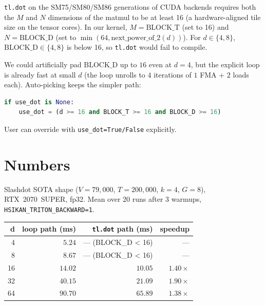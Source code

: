\documentclass[11pt,a4paper]{article}
\begin{document}
\texttt{tl.dot} on the SM75/SM80/SM86 generations of CUDA backends
requires both the $M$ and $N$ dimensions of the matmul to be at least
16 (a hardware-aligned tile size on the tensor cores). In our kernel,
$M = \mathrm{BLOCK\_T}$ (set to 16) and $N = \mathrm{BLOCK\_D}$ (set
to $\min(64, \mathrm{next\_power\_of\_2}(d))$). For $d \in \{4, 8\}$,
$\mathrm{BLOCK\_D} \in \{4, 8\}$ is below 16, so \texttt{tl.dot} would
fail to compile.

We could artificially pad $\mathrm{BLOCK\_D}$ up to $16$ even at
$d = 4$, but the explicit loop is already fast at small $d$ (the loop
unrolls to $4$ iterations of $1$ FMA + $2$ loads each). Auto-picking
keeps the simpler path:

\begin{lstlisting}[language=Python]
if use_dot is None:
    use_dot = (d >= 16 and BLOCK_T >= 16 and BLOCK_D >= 16)
\end{lstlisting}

User can override with \texttt{use\_dot=True/False} explicitly.

\section{Numbers}

Slashdot SOTA shape ($V = 79{,}000$, $T = 200{,}000$, $k = 4$,
$G = 8$), RTX~2070~SUPER, fp32. Mean over 20 runs after 3 warmups,
\texttt{HSIKAN\_TRITON\_BACKWARD=1}.

\begin{center}\small
\begin{tabular}{r r r r}
\toprule
\textbf{d} & \textbf{loop path (ms)} & \textbf{\texttt{tl.dot} path (ms)} & \textbf{speedup} \\
\midrule
4   & $5.24$  & --- (BLOCK\_D < 16)         & ---                    \\
8   & $8.67$  & --- (BLOCK\_D < 16)         & ---                    \\
16  & $14.02$ & $\mathbf{10.05}$ & $\mathbf{1.40\times}$  \\
32  & $40.15$ & $\mathbf{21.09}$ & $\mathbf{1.90\times}$  \\
64  & $90.70$ & $\mathbf{65.89}$ & $\mathbf{1.38\times}$  \\
\bottomrule
\end{tabular}
\end{center}
\end{document}
